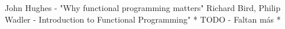 \documentclass{llncs}
\begin{document}
%
%
\begin{thebibliography}{}
  John Hughes - "Why functional programming matters"
  Richard Bird, Philip Wadler - Introduction to Functional Programming"
    * TODO - Faltan más *
\end{thebibliography}
\end{document}
